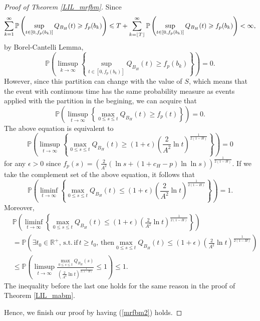 \documentclass[main.tex]{subfiles}
\begin{document}
\begin{proof}[Proof of Theorem \ref{LIL_mrfbm}]
Since$$\sum^{\infty}_{k=1}\mathbb{P}\left(\sup\limits_{t\in[0,f_p(b_k)]}Q_{B_H}(t)\geqslant f_p(b_k)\right)\leqslant T + \sum^{\infty}_{k=\floor*{T}}\mathbb{P}\left(\sup\limits_{t\in[0,f_p(b_k)]}Q_{B_H}(t)\geqslant f_p(b_k)\right)<\infty,$$
by Borel-Cantelli Lemma,
$$\mathbb{P}\left(\limsup\limits_{k\to\infty}\left\{\sup\limits_{t\in[0,f_p(b_k)]}Q_{B_H}(t)\geqslant f_p(b_k)\right\}\right)=0.$$
However, since this partition can change with the value of $S$, which means that the event with continuous time has the same probability measure as events applied with the partition in the begining, 
we can acquire that
$$\mathbb{P}\left(\limsup\limits_{t\to\infty}\left\{\max\limits_{0\leqslant s \leqslant t}Q_{B_H}(t)\geqslant f_p(t)\right\}\right)=0.$$
The above equation is equivalent to
$$\mathbb{P}\left(\limsup\limits_{t\to\infty}\left\{\max\limits_{0\leqslant s \leqslant t}Q_{B_H}(t)\geqslant (1+\epsilon)\left(\frac{2}{A^2}\ln t\right)^{\frac{1}{2(1-H)}}\right\}\right)=0$$
for any $\epsilon>0$ since $f_p(s)= \left(\frac{2}{A^2}(\ln s + (1+c_H-p)\ln\ln s)\right)^{\frac{1}{2(1-H)}}$.
If we take the complement set of the above equation, it follows that
$$\mathbb{P}\left(\liminf\limits_{t\to\infty}\left\{\max\limits_{0\leqslant s \leqslant t}Q_{B_H}(t)\leqslant (1+\epsilon)\left(\frac{2}{A^2}\ln t\right)^{\frac{1}{2(1-H)}}\right\}\right)=1.$$
Moreover,
\begin{align*}
	&\mathbb{P}\left(\liminf\limits_{t\to\infty}\left\{\max\limits_{0\leqslant s \leqslant t}Q_{B_H}(t)\leqslant (1+\epsilon)\left(\frac{2}{A^2}\ln t\right)^{\frac{1}{2(1-H)}}\right\}\right)\\
	&=\mathbb{P}\left(\exists t_0\in\mathbb{R}^+,\,\mathrm{s.t.\, if\,}t\geqslant t_0\mathrm{,\,then}\max\limits_{0\leqslant s \leqslant t}Q_{B_H}(t)\leqslant (1+\epsilon)\left(\frac{2}{A^2}\ln t\right)^{\frac{1}{2(1-H)}}\right)\\
	&\leqslant\mathbb{P}\left(\limsup\limits_{t\to\infty}\frac{\max\limits_{0\leqslant s\leqslant t}Q_{B_H}(s)}{\left(\frac{2}{A^2}\ln t\right)^\frac{1}{2(1-H)}}\leqslant 1\right)\leqslant1.
\end{align*}
The inequality before the last one holds for the same reason in the proof of Theorem \ref{LIL_mabm}.

Hence, we finish our proof by having (\ref{mrfbm2}) holds.
\end{proof}
\end{document}
